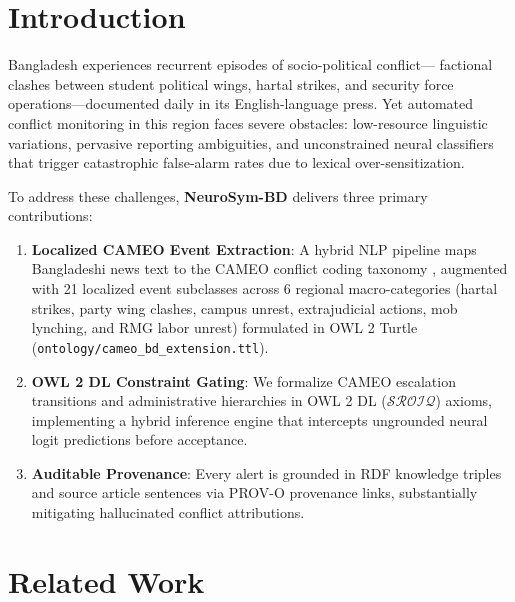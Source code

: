 \documentclass[11pt,a4paper]{article}
\begin{document}
\begin{abstract}
All code, benchmarks, ontology schemas, and evaluation scripts are released under the MIT License at
\url{https://github.com/anonymised/neurosym-bd}.
\end{abstract}

\section{Introduction}
\label{sec:intro}

Bangladesh experiences recurrent episodes of socio-political conflict—
factional clashes between student political wings, hartal strikes, and security force operations—documented
daily in its English-language press.
Yet automated conflict monitoring in this region faces severe obstacles: low-resource linguistic variations,
pervasive reporting ambiguities, and unconstrained neural classifiers that trigger catastrophic false-alarm rates
due to lexical over-sensitization.

To address these challenges, \textbf{NeuroSym-BD} delivers three primary contributions:

\begin{enumerate}
  \item \textbf{Localized CAMEO Event Extraction}: A hybrid NLP pipeline maps Bangladeshi news text to the CAMEO
    conflict coding taxonomy \citep{gerner2002,schrodt2012}, augmented with 21 localized event subclasses across
    6 regional macro-categories (hartal strikes, party wing clashes, campus unrest, extrajudicial actions, mob lynching,
    and RMG labor unrest) formulated in OWL 2 Turtle (\texttt{ontology/cameo\_bd\_extension.ttl}).
  \item \textbf{OWL 2 DL Constraint Gating}: We formalize CAMEO escalation transitions and administrative
    hierarchies in OWL 2 DL ($\mathcal{SROIQ}$) axioms, implementing a hybrid inference engine that intercepts
    ungrounded neural logit predictions before acceptance.
  \item \textbf{Auditable Provenance}: Every alert is grounded in RDF knowledge triples and source article sentences
    via PROV-O provenance links, substantially mitigating hallucinated conflict attributions.
\end{enumerate}

\section{Related Work}
\label{sec:related}
\end{document}
